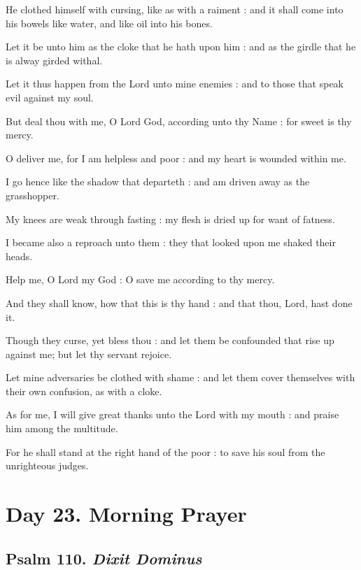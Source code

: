 He clothed himself with cursing, like as with a raiment : and it shall come into his bowels like water, and like oil into his bones.\par
{}Let it be unto him as the cloke that he hath upon him : and as the girdle that he is alway girded withal.\par
{}Let it thus happen from the Lord unto mine enemies : and to those that speak evil against my soul.\par
{}But deal thou with me, O Lord God, according unto thy Name : for sweet is thy mercy.\par
{}O deliver me, for I am helpless and poor : and my heart is wounded within me.\par
{}I go hence like the shadow that departeth : and am driven away as the grasshopper.\par
{}My knees are weak through fasting : my flesh is dried up for want of fatness.\par
{}I became also a reproach unto them : they that looked upon me shaked their heads.\par
{}Help me, O Lord my God : O save me according to thy mercy.\par
{}And they shall know, how that this is thy hand : and that thou, Lord, hast done it.\par
{}Though they curse, yet bless thou : and let them be confounded that rise up against me; but let thy servant rejoice.\par
{}Let mine adversaries be clothed with shame : and let them cover themselves with their own confusion, as with a cloke.\par
{}As for me, I will give great thanks unto the Lord with my mouth : and praise him among the multitude.\par
{}For he shall stand at the right hand of the poor : to save his soul from the unrighteous judges.\par

\section*{Day 23. Morning Prayer}

\subsection{Psalm 110. \textit{Dixit Dominus}}

